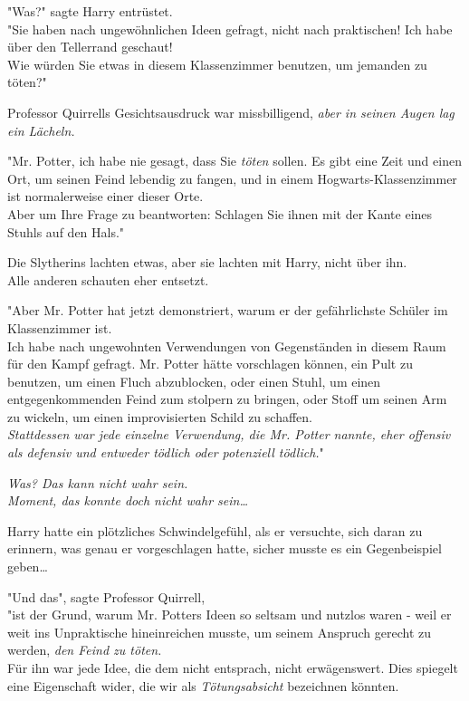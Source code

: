 {"Was?" sagte Harry entrüstet.\\ "Sie haben nach ungewöhnlichen Ideen gefragt, nicht nach praktischen! Ich habe über den Tellerrand geschaut!\\ Wie würden Sie etwas in diesem Klassenzimmer benutzen, um jemanden zu töten?"

Professor Quirrells Gesichtsausdruck war missbilligend, \emph{aber in seinen Augen lag ein Lächeln.}

"Mr. Potter, ich habe nie gesagt, dass Sie \emph{töten} sollen. Es gibt eine Zeit und einen Ort, um seinen Feind lebendig zu fangen, und in einem Hogwarts-Klassenzimmer ist normalerweise einer dieser Orte.\\ Aber um Ihre Frage zu beantworten: Schlagen Sie ihnen mit der Kante eines Stuhls auf den Hals."

Die Slytherins lachten etwas, aber sie lachten mit Harry, nicht über ihn.\\ Alle anderen schauten eher entsetzt.

"Aber Mr. Potter hat jetzt demonstriert, warum er der gefährlichste Schüler im Klassenzimmer ist.\\ Ich habe nach ungewohnten Verwendungen von Gegenständen in diesem Raum für den Kampf gefragt. Mr. Potter hätte vorschlagen können, ein Pult zu benutzen, um einen Fluch abzublocken, oder einen Stuhl, um einen entgegenkommenden Feind zum stolpern zu bringen, oder Stoff um seinen Arm zu wickeln, um einen improvisierten Schild zu schaffen.\\ \emph{Stattdessen war jede einzelne Verwendung, die Mr. Potter nannte, eher offensiv als defensiv und entweder tödlich oder potenziell tödlich.}"

\emph{Was? Das kann nicht wahr sein.\\ } \emph{Moment, das konnte doch nicht wahr sein…}

Harry hatte ein plötzliches Schwindelgefühl, als er versuchte, sich daran zu erinnern, was genau er vorgeschlagen hatte, sicher musste es ein Gegenbeispiel geben…

"Und das", sagte Professor Quirrell,\\ "ist der Grund, warum Mr. Potters Ideen so seltsam und nutzlos waren - weil er weit ins Unpraktische hineinreichen musste, um seinem Anspruch gerecht zu werden, \emph{den Feind zu töten.}\\ Für ihn war jede Idee, die dem nicht entsprach, nicht erwägenswert. Dies spiegelt eine Eigenschaft wider, die wir als \emph{Tötungsabsicht} bezeichnen könnten.

}
